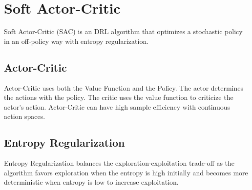 \section{Soft Actor-Critic}
Soft Actor-Critic (SAC) is an DRL algorithm that optimizes a stochastic policy in an off-policy way with entropy regularization.
\subsection{Actor-Critic}
Actor-Critic uses both the Value Function and the Policy. The actor determines the actions with the policy. The critic uses the value function to criticize the actor's action. Actor-Critic can have high sample efficiency with continuous action spaces.

\subsection{Entropy Regularization}
Entropy Regularization balances the exploration-exploitation trade-off as the algorithm favors exploration when the entropy is high initially and becomes more deterministic when entropy is low to increase exploitation.